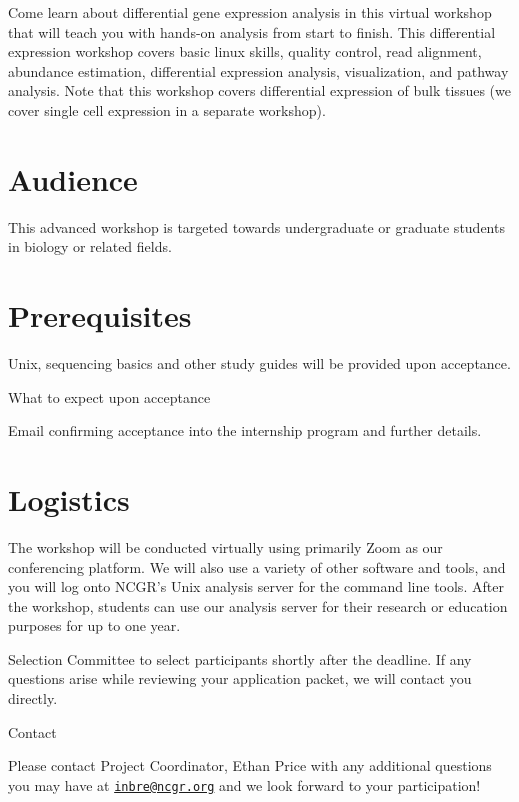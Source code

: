 \documentclass[
]{book}
\begin{document}
Come learn about differential gene expression analysis in this virtual workshop that will teach you with hands-on analysis from start to finish. This differential expression workshop covers basic linux skills, quality control, read alignment, abundance estimation, differential expression analysis, visualization, and pathway analysis. Note that this workshop covers differential expression of bulk tissues (we cover single cell expression in a separate workshop).

\hypertarget{audience-3}{%
\section*{Audience}\label{audience-3}}

This advanced workshop is targeted towards undergraduate or graduate students in biology or related fields.

\hypertarget{prerequisites-3}{%
\section*{Prerequisites}\label{prerequisites-3}}

Unix, sequencing basics and other study guides will be provided upon acceptance.

What to expect upon acceptance

Email confirming acceptance into the internship program and further details.

\hypertarget{logistics-3}{%
\section*{Logistics}\label{logistics-3}}

The workshop will be conducted virtually using primarily Zoom as our conferencing platform. We will also use a variety of other software and tools, and you will log onto NCGR's Unix analysis server for the command line tools. After the workshop, students can use our analysis server for their research or education purposes for up to one year.

Selection Committee to select participants shortly after the deadline. If any questions arise while reviewing your application packet, we will contact you directly.

Contact

Please contact Project Coordinator, Ethan Price with any additional questions you may have at \href{mailto:inbre@ncgr.org}{\nolinkurl{inbre@ncgr.org}} and we look forward to your participation!
\end{document}
